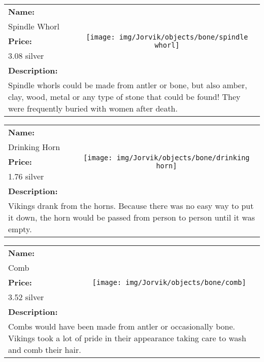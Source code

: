 \begin{table}[ht!]
	\centering
	\begin{tabular}{ p{3cm} c }\toprule
		\textbf{Name:} & \multirow{5}{*}{\texttt{[image: img/Jorvik/objects/bone/spindle whorl]}}\\
		Spindle Whorl & \\ 
		\textbf{Price:} & \\
		3.08 silver & \\ 
		\textbf{Description:} & \\
		\multicolumn{2}{p{12cm}}{Spindle whorls could be made from antler or bone, but also amber, clay, wood, metal or any type of stone that could be found! They were frequently buried with women after death.}\\
		\bottomrule
	\end{tabular}
\end{table}

\begin{table}[ht!]
	\centering
	\begin{tabular}{ p{3cm} c }\toprule
		\textbf{Name:} & \multirow{5}{*}{\texttt{[image: img/Jorvik/objects/bone/drinking horn]}}\\
		Drinking Horn & \\ 
		\textbf{Price:} & \\
		1.76 silver & \\ 
		\textbf{Description:} & \\
		\multicolumn{2}{p{12cm}}{Vikings drank from the horns. Because there was no easy way to put it down, the horn would be passed from person to person until it was empty.}\\
		\bottomrule
	\end{tabular}
\end{table}

\begin{table}[ht!]
	\centering
	\begin{tabular}{ p{3cm} c }\toprule
		\textbf{Name:} & \multirow{5}{*}{\texttt{[image: img/Jorvik/objects/bone/comb]}}\\
		Comb & \\ 
		\textbf{Price:} & \\
		3.52 silver & \\ 
		\textbf{Description:} & \\
		\multicolumn{2}{p{12cm}}{Combs would have been made from antler or occasionally bone. Vikings took a lot of pride in their appearance taking care to wash and comb their hair.}\\
		\bottomrule
	\end{tabular}
\end{table}

